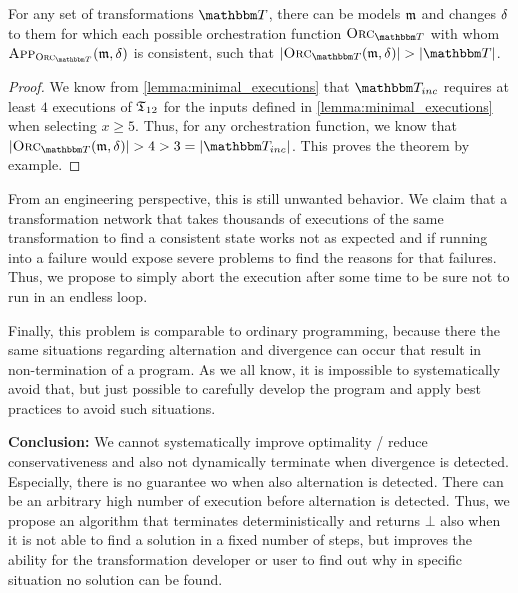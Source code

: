 \begin{theorem}
    \label{theorem:unbounded_execution}
    For any set of transformations $\transformationset{T}$, there can be models $\mathfrak{m}$ and changes $\mathfrak{\delta}_{}$ to them for which each possible orchestration function $\orcfunction{\transformationset{T}}$ with whom $\appfunction{\orcfunction{\transformationset{T}}}(\modeltuple{m}, \changetuple{})$ is consistent, such that $\abs{\orcfunction{\transformationset{T}}(\modeltuple{m}, \changetuple{})} > \abs{\transformationset{T}}$.
\end{theorem}
\begin{proof}
    We know from \autoref{lemma:minimal_executions} that $\transformationset{T}_{inc}$ requires at least $4$ executions of $\mathfrak{T}_{12}$ for the inputs defined in \autoref{lemma:minimal_executions} when selecting $x \geq 5$.
    Thus, for any orchestration function, we know that $\abs{\orcfunction{\transformationset{T}}(\modeltuple{m}, \changetuple{})} > 4 > 3 = \abs{\transformationset{T}_{inc}}$.
    This proves the theorem by example.
\end{proof}

From an engineering perspective, this is still unwanted behavior. We claim that a transformation network that takes thousands of executions of the same transformation to find a consistent state works not as expected and if running into a failure would expose severe problems to find the reasons for that failures.
Thus, we propose to simply abort the execution after some time to be sure not to run in an endless loop.

Finally, this problem is comparable to ordinary programming, because there the same situations regarding alternation and divergence can occur that result in non-termination of a program.
As we all know, it is impossible to systematically avoid that, but just possible to carefully develop the program and apply best practices to avoid such situations.


\textbf{Conclusion:} We cannot systematically improve optimality / reduce conservativeness and also not dynamically terminate when divergence is detected. Especially, there is no guarantee wo when also alternation is detected. There can be an arbitrary high number of execution before alternation is detected.
Thus, we propose an algorithm that terminates deterministically and returns $\bot$ also when it is not able to find a solution in a fixed number of steps, but improves the ability for the transformation developer or user to find out why in specific situation no solution can be found.




